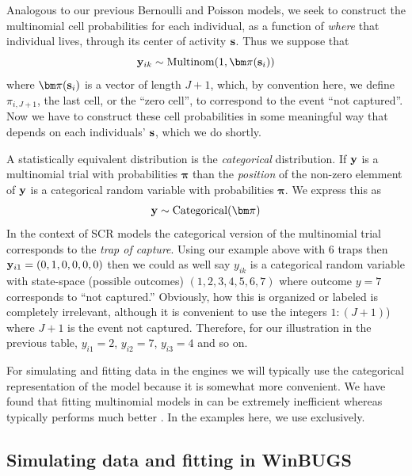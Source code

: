 Analogous to our previous Bernoulli and Poisson models, we seek to
construct the multinomial cell probabilities for each individual, as a
function of {\it where} that individual lives, through its center of
activity ${\bf s}$. Thus we suppose that
\begin{equation}
 {\bf y}_{ik} \sim \mbox{Multinom}(1, {\bm \pi}({\bf s}_{i}) )
\label{poisson-mn.eq.mn}
\end{equation}
where ${\bm \pi}({\bf s}_{i})$ is a vector of length $J+1$, which, by
convention here, we define $\pi_{i,J+1}$, the last cell, or the ``zero
cell'', to correspond to the event ``not captured''.  Now we have to
construct these cell probabilities in some meaningful way that depends
on each individuals' ${\bf s}$, which we do shortly.

A statistically equivalent distribution is the {\it categorical}
distribution.  If ${\bf y}$ is a multinomial trial with probabilities
${\bm \pi}$ than the {\it position} of the non-zero elemment of ${\bf
  y}$ is a categorical random variable with probabilities ${\bm \pi}$.
We express this as
\[
{\bf y} \sim \mbox{Categorical}( {\bm \pi} )
\]
In the context of SCR models the categorical version of the
multinomial trial corresponds to the {\it trap of capture}.  Using our
example above with 6 traps then ${\bf y}_{i1} = (0,1,0,0,0,0)$ then we
could as well say $y_{ik}$ is a categorical random variable with
state-space (possible outcomes) $(1,2,3,4,5,6,7)$ where outcome $y=7$
corresponds to ``not captured.'' Obviously, how this is organized or
labeled is completely irrelevant, although it is convenient to use the
integers $1:(J+1)$) where $J+1$ is the event not captured.  Therefore,
for our illustration in the previous table, $y_{i1} = 2$, $y_{i2} =
7$, $y_{i3} = 4$ and so on.

For simulating and fitting data in the \bugs engines we will typically use
the categorical representation of the model because it is somewhat
more convenient.  We have found that fitting multinomial models in
\winbugs can be extremely inefficient whereas \jags
typically performs much better \citep{converse_royle:2013}. In the examples here, we use \jags
 exclusively.





\subsection{Simulating data and fitting in WinBUGS}

